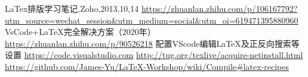 \documentclass[10pt, UTF8]{ctexart}%
\begin{document}
    


    
    \begin{thebibliography}{123456}%
         LaTex排版学习笔记,Zoho,2013,10,14
         \url{https://zhuanlan.zhihu.com/p/106167792?utm_source=wechat_session&utm_medium=social&utm_oi=619471395880960}
        \newline VsCode+\LaTeX 完全解决方案（2020年）
         \url{https://zhuanlan.zhihu.com/p/90526218}
        \newline 配置VScode编辑\LaTeX 及正反向搜索等设置
          \url{https://code.visualstudio.com}
         \url{http://tug.org/texlive/acquire-netinstall.html}
         \url{https://github.com/James-Yu/LaTeX-Workshop/wiki/Compile#latex-recipes}

    \end{thebibliography}
\end{document}
